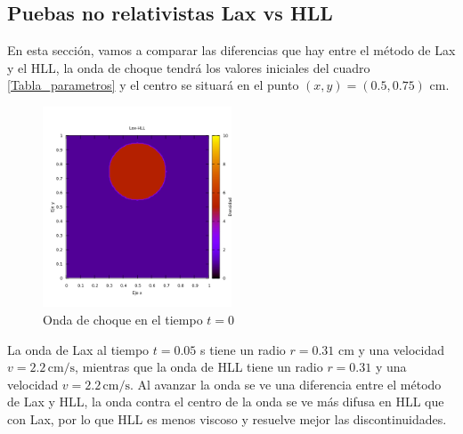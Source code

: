 \documentclass[12pt,a4paper]{book}
\begin{document}
\subsection{Puebas no relativistas Lax vs HLL} %

En esta sección, vamos a comparar las diferencias que hay entre el método de Lax y el HLL, la onda de choque tendrá los valores iniciales del cuadro \ref{Tabla_parametros} y el centro se situará en el punto $(x,y) = (0.5,0.75)$ cm.

\begin{figure}[H]
\centering
\includegraphics[width=0.5\textwidth]{./Figuras/Pruebas/Prueba_onda_choque/onda_choque5_t_0}
\caption{Onda de choque en el tiempo $t = 0$} \label{fig:onda_choque5_t_0}
\end{figure}

La onda de Lax al tiempo $t = 0.05$ s tiene un radio $r=0.31$ cm y una velocidad $v = 2.2 \, \mathrm{cm}/\mathrm{s}$, mientras que la onda de HLL tiene un radio $r = 0.31$ y una velocidad $v = 2.2 \, \mathrm{cm}/\mathrm{s}$. Al avanzar la onda se ve una diferencia entre el método de Lax y HLL, la onda contra el centro de la onda se ve más difusa en HLL que con Lax, por lo que HLL es menos viscoso y resuelve mejor las discontinuidades.
\end{document}
